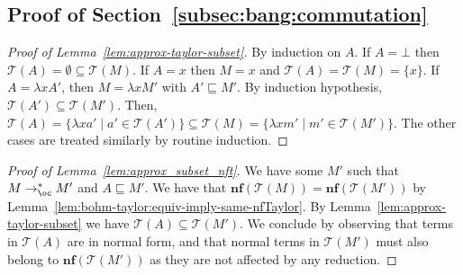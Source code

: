 \documentclass[10pt,a4paper]{article}
\newcommand{\<}{\langle}
\renewcommand{\>}{\rangle}
\newcommand{\nf}[1]{\mathbf{nf}(#1)}
\newcommand{\todbf}{\to_{\oc}} %
\newcommand{\taylor}[1]{\ensuremath{\mathcal{T}(#1)}}
\newcommand{\smaller}{\ensuremath{\sqsubseteq}}
\begin{document}

\subsection{Proof of Section~\ref{subsec:bang:commutation}}

\begin{proof}[Proof of Lemma~\ref{lem:approx-taylor-subset}]
	By induction on $A$. If $A=\bot$ then $\taylor
	A=\emptyset\subseteq\taylor M$. If $A=x$ then $M=x$ and $\taylor
	A=\taylor M=\{x\}$. If $A=\lambda xA'$, then $M=\lambda xM'$ with $A'\smaller
	M'$. By induction hypothesis, $\taylor{ A'}\subseteq\taylor {M'}$. Then,
	$\taylor A=\{\lambda xa'\mid a'\in\taylor {A'}\}\subseteq\taylor M=\{\lambda
	xm'\mid m'\in\taylor {M'}\}$. The other cases are treated similarly by routine
	induction.
\end{proof}


\begin{proof}[Proof of Lemma~\ref{lem:approx_subset_nft}]
	We have some $M'$ such that $M\todbf^* M'$ and $A\smaller M'$. We have
	that $\nf{\taylor M}=\nf{\taylor{M'}}$ by Lemma~\ref{lem:bohm-taylor:equiv-imply-same-nfTaylor}.
	By Lemma~\ref{lem:approx-taylor-subset} we have $\taylor A\subseteq\taylor{M'}$. We conclude by
	observing that terms in $\taylor A$ are in normal form, and that normal terms in
	$\taylor {M'}$ must also belong to $\nf{\taylor{M'}}$ as they are not affected
	by any reduction.
\end{proof}
\end{document}
